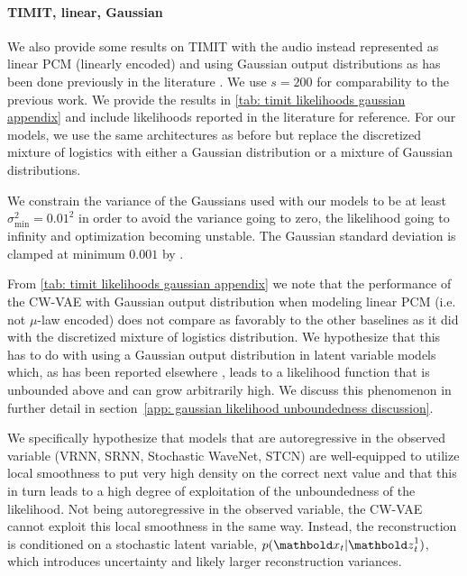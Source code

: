 {\paragraph{TIMIT, linear, Gaussian} We also provide some results on TIMIT with the audio instead represented as linear PCM (linearly encoded) and using Gaussian output distributions as has been done previously in the literature \parencite{chung_recurrent_2015, fraccaro_sequential_2016, lai_stochastic_2018, aksan_stcn_2019}. We use $s=200$ for comparability to the previous work. We provide the results in \cref{tab: timit likelihoods gaussian appendix} and include likelihoods reported in the literature for reference. For our models, we use the same architectures as before but replace the discretized mixture of logistics with either a Gaussian distribution or a mixture of Gaussian distributions.

We constrain the variance of the Gaussians used with our models to be at least $\sigma^2_\text{min} = 0.01^2$ in order to avoid the variance going to zero, the likelihood going to infinity and optimization becoming unstable. The Gaussian standard deviation is clamped at minimum $0.001$ by \parencite{aksan_stcn_2019}.

From \cref{tab: timit likelihoods gaussian appendix} we note that the performance of the CW-VAE with Gaussian output distribution when modeling linear PCM (i.e. not $\mu$-law encoded) does not compare as favorably to the other baselines as it did with the discretized mixture of logistics distribution. We hypothesize that this has to do with using a Gaussian output distribution in latent variable models which, as has been reported elsewhere \parencite{mattei_leveraging_2018}, leads to a likelihood function that is unbounded above and can grow arbitrarily high. We discuss this phenomenon in further detail in section~\cref{app: gaussian likelihood unboundedness discussion}. 

We specifically hypothesize that models that are autoregressive in the observed variable (VRNN, SRNN, Stochastic WaveNet, STCN) are well-equipped to utilize local smoothness to put very high density on the correct next value and that this in turn leads to a high degree of exploitation of the unboundedness of the likelihood. Not being autoregressive in the observed variable, the CW-VAE cannot exploit this local smoothness in the same way. Instead, the reconstruction is conditioned on a stochastic latent variable, $p(\xb_t|\zb^1_t)$, which introduces uncertainty and likely larger reconstruction variances.


}
